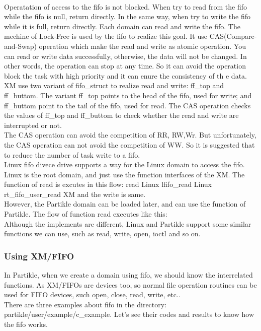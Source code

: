\\
Operatation of access to the fifo is not blocked. When try to read from the fifo while the fifo is null, return directly. In the same way, when try to write the fifo while it is full, return directly. Each domain can read and write the fifo. The mechine of Lock-Free is used by the fifo to realize this goal. It use CAS(Compare-and-Swap) operation which make the read and write as atomic operation. You can read or write data successfully, otherwise, the data will not be changed. In other words, the operation can stop at any time. So it can avoid the operation block the task with high priority and it can enure the consistency of th e data.
\\
XM use two variant of fifo\_struct to realize read and write: ff\_top and ff\_buttom. The variant ff\_top points to the head of the fifo, used for write; and ff\_buttom point to the tail of the fifo, used for read. The CAS operation checks the values of ff\_top and ff\_buttom to check whether the read and write are interrupted or not.
\\
The CAS operation can avoid the competition of RR, RW,Wr. But unfortunately, the CAS operation can not avoid the competition of WW. So it is suggested that to reduce the number of task write to a fifo. 
\\
Linux fifo divece drive supports a way for the Linux domain to access the fifo. Linux is the root domain, and just use the function interfaces of the XM. The function of read is excutes in this flow:
read               Linux
lfifo\_read          Linux
rt\_fifo\_user\_read    XM
and the write is same.
\\
However, the Partikle domain can be loaded later, and can use the function of Partikle. The flow of function read executes like this:
\\
Although the implements are different, Linux and Partikle support some similar functions we can use, such as read, write, open, ioctl and so on.

\subsubsection{Using XM/FIFO}
In Partikle, when we create a domain using fifo, we should know the interrelated functions. As XM/FIFOs are devices too, so normal file operation routines can be used for FIFO devices, such open, close, read, write, etc..
\\
There are three examples about fifo in the directory: partikle/user/example/c\_example. Let's see their codes and results to know how the fifo works. \\

